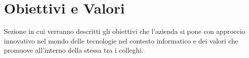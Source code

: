 \section{Obiettivi e Valori}

Sezione in cui verranno descritti gli obiettivi che l'azienda si pone con approccio innovativo nel mondo delle tecnologie nel contesto informatico e dei valori che promuove all'interno della stessa tra i colleghi.